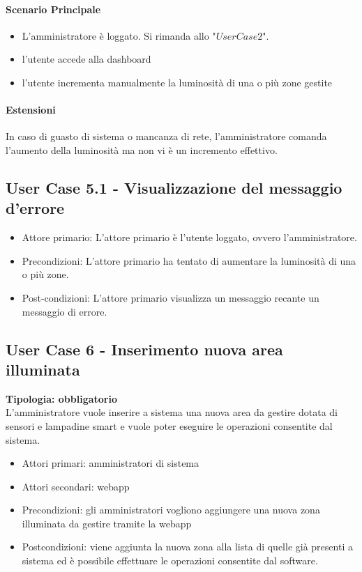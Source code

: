 \documentclass[12pt]{article}
\begin{document}
\paragraph{Scenario Principale}
\begin{itemize}
	\item L'amministratore è loggato. Si rimanda allo "$User Case 2$".
	\item l'utente accede alla dashboard
	\item l'utente incrementa manualmente la luminosità di una o più zone gestite
\end{itemize}

\paragraph{Estensioni} In caso di guasto di sistema o mancanza di rete, l'amministratore comanda l'aumento della luminosità ma non vi è un incremento effettivo.

\subsection{User Case 5.1 - Visualizzazione del messaggio d'errore}
\begin{itemize}
	\item Attore primario: L'attore primario è l'utente loggato, ovvero l'amministratore.
	\item Precondizioni: L'attore primario ha tentato di aumentare la luminosità di una o più zone.
	\item Post-condizioni: L'attore primario visualizza un messaggio recante un messaggio di errore.
\end{itemize}

\subsection{User Case 6 - Inserimento nuova area illuminata}
\textbf{Tipologia: obbligatorio} \\
L'amministratore vuole inserire a sistema una nuova area da gestire dotata di sensori e lampadine smart e vuole poter eseguire le operazioni consentite dal sistema.
\begin{itemize}
	\item Attori primari: amministratori di sistema
	\item Attori secondari: webapp
	\item Precondizioni: gli amministratori vogliono aggiungere una nuova zona illuminata da gestire tramite la webapp
	\item Postcondizioni: viene aggiunta la nuova zona alla lista di quelle già presenti a sistema ed è possibile effettuare le operazioni consentite dal software.
\end{itemize}
\end{document}
